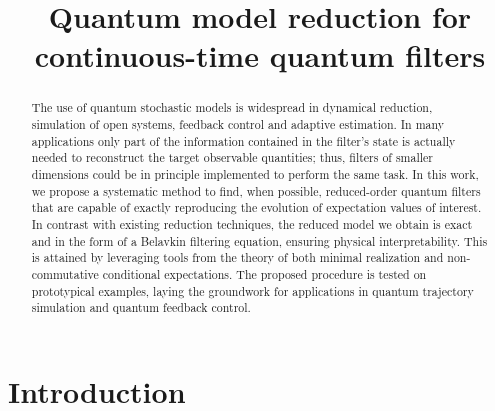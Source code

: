 \documentclass[aihp,12pt]{imsart}
\theoremstyle{theorem}
\theoremstyle{definition}
\theoremstyle{remark}
\begin{document}
\begin{frontmatter}
\title{Quantum model reduction for continuous-time quantum filters}


\begin{abstract}
The use of quantum stochastic models is widespread in dynamical reduction, simulation of open systems, feedback control and adaptive estimation. In many applications only part of the information contained in the filter's state is actually needed to reconstruct the target observable quantities; thus, filters of smaller dimensions could be in principle implemented to perform the same task. In this work, we propose a systematic method to find, when possible, reduced-order quantum filters that are capable of exactly reproducing the evolution of expectation values of interest. In contrast with existing reduction techniques, the reduced model we obtain is exact and in the form of a Belavkin filtering equation, ensuring physical interpretability. This is attained by leveraging tools from the theory of both minimal realization and non-commutative conditional expectations. The proposed procedure is tested on prototypical examples, laying the groundwork for applications in quantum trajectory simulation and quantum feedback control.
\end{abstract}
\end{frontmatter}

\section{Introduction}
\end{document}
